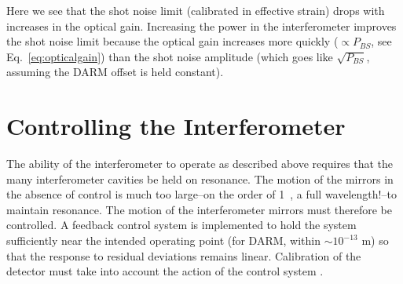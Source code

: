 Here we see that the shot noise limit (calibrated in effective strain)
drops with increases in the optical gain.  Increasing the power in the
interferometer improves the shot noise limit because the optical gain
increases more quickly ($\propto P_{BS}$, see
Eq.~\ref{eq:opticalgain}) than the shot noise amplitude (which goes
like $\sqrt{P_{BS}}$, assuming the DARM offset is held constant).








\section{Controlling the Interferometer}
The ability of the interferometer to operate as described above
requires that the many interferometer cavities be held on
resonance. The motion of the mirrors in the absence of control is much
too large--on the order of 1~\micron, a full wavelength!--to maintain
resonance.  The motion of the interferometer mirrors must therefore be
controlled.  A feedback control system is implemented to hold the
system sufficiently near the intended operating point (for DARM,
within $\sim 10^{-13}$ m) so that the response to residual deviations
remains linear. Calibration of the detector must take into account the
action of the control system \cite{KisselCalibrationPaper}.


